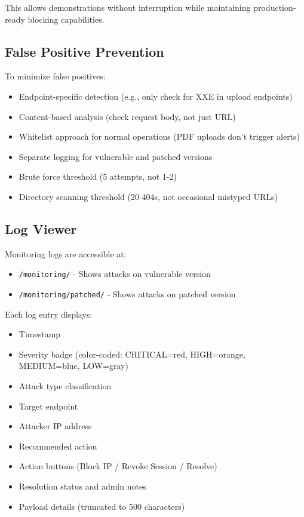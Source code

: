 \documentclass[12pt,a4paper]{article}
\begin{document}
This allows demonstrations without interruption while maintaining production-ready blocking capabilities.

\subsection{False Positive Prevention}

To minimize false positives:
\begin{itemize}[leftmargin=*]
    \item Endpoint-specific detection (e.g., only check for XXE in upload endpoints)
    \item Content-based analysis (check request body, not just URL)
    \item Whitelist approach for normal operations (PDF uploads don't trigger alerts)
    \item Separate logging for vulnerable and patched versions
    \item Brute force threshold (5 attempts, not 1-2)
    \item Directory scanning threshold (20 404s, not occasional mistyped URLs)
\end{itemize}

\subsection{Log Viewer}

Monitoring logs are accessible at:
\begin{itemize}[leftmargin=*]
    \item \texttt{/monitoring/} - Shows attacks on vulnerable version
    \item \texttt{/monitoring/patched/} - Shows attacks on patched version
\end{itemize}

Each log entry displays:
\begin{itemize}[leftmargin=*]
    \item Timestamp
    \item Severity badge (color-coded: CRITICAL=red, HIGH=orange, MEDIUM=blue, LOW=gray)
    \item Attack type classification
    \item Target endpoint
    \item Attacker IP address
    \item Recommended action
    \item Action buttons (Block IP / Revoke Session / Resolve)
    \item Resolution status and admin notes
    \item Payload details (truncated to 500 characters)
\end{itemize}
\end{document}
